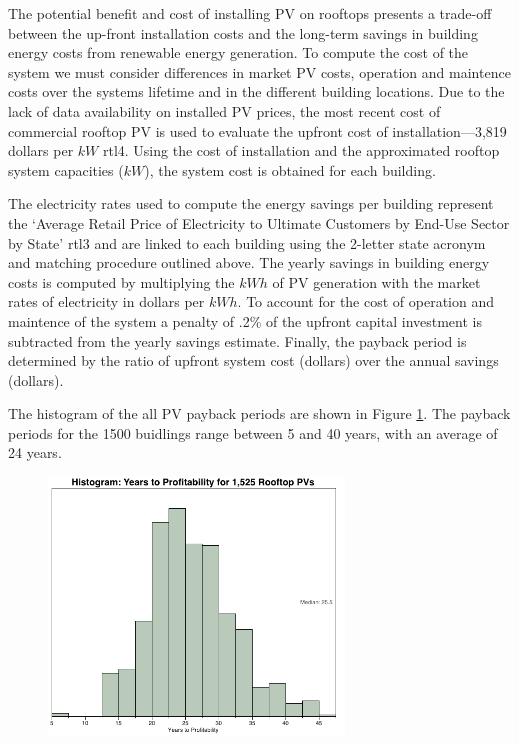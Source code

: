 The potential benefit and cost of installing PV on rooftops presents a trade-off between the up-front installation costs and the long-term savings in building energy costs from renewable energy generation. To compute the cost of the system we must consider differences in market PV costs, operation and maintence costs over the systems lifetime and in the different building locations. Due to the lack of data availability on installed PV prices, the most recent cost of commercial rooftop PV is used to evaluate the upfront cost of installation---3,819 dollars per $kW$ \cite{roisin}{rtl4}. Using the cost of installation and the approximated rooftop system capacities ($kW$), the system cost is obtained for each building. 
\par
The electricity rates used to compute the energy savings per building represent the `Average Retail Price of Electricity to Ultimate Customers by End-Use Sector by State' \cite{roisin}{rtl3} and are linked to each building using the 2-letter state acronym and matching procedure outlined above. The yearly savings in building energy costs is computed by multiplying the $kWh$ of PV generation with the market rates of electricity in dollars per $kWh$. To account for the cost of operation and maintence of the system a penalty of .2\% of the upfront capital investment is subtracted from the yearly savings estimate. Finally, the payback period is determined by the ratio of upfront system cost (dollars) over the annual savings (dollars). 
\par
The histogram of the all PV payback periods are shown in Figure \ref{fig:rtl_pic4}. The payback periods for the 1500 buidlings range between 5 and 40 years, with an average of 24 years.
\begin{figure}
  \centering
    \includegraphics[width=0.7\textwidth]{pics/rtl_pic4}
  \label{fig:rtl_pic4}
\end{figure}
